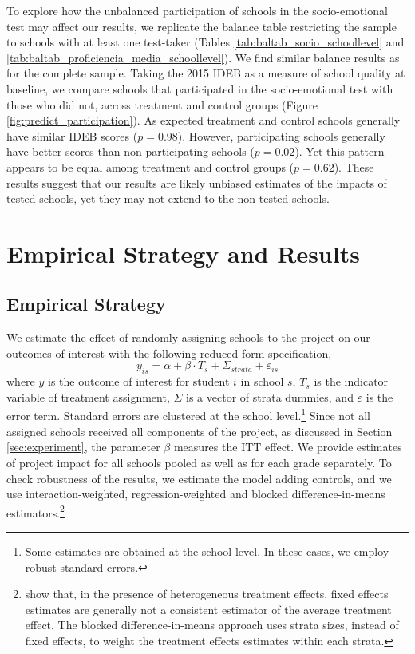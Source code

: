 \documentclass[11pt,a4paper]{article}
\begin{document}
To explore how the unbalanced participation of schools in the socio-emotional test may affect our results, we replicate the balance table restricting the sample to schools with at least one test-taker (Tables \ref{tab:baltab_socio_schoollevel} and \ref{tab:baltab_proficiencia_media_schoollevel}). We find similar balance results as for the complete sample. Taking the 2015 IDEB as a measure of school quality at baseline, we compare schools that participated in the socio-emotional test with those who did not, across treatment and control groups (Figure \ref{fig:predict_participation}). As expected treatment and control schools generally have similar IDEB scores ($p=0.98$). However, participating schools generally have better scores than non-participating schools ($p=0.02$). Yet this pattern appears to be equal among treatment and control groups ($p=0.62$). These results suggest that our results are likely unbiased estimates of the impacts of tested schools, yet they may not extend to the non-tested schools. 



\section{Empirical Strategy and Results} \label{sec:methodology_results}
\subsection{Empirical Strategy} \label{sec:methodology}

We estimate the effect of randomly assigning schools to the project on our outcomes of interest with the following reduced-form specification,
\begin{equation} \label{eq:OLS}
    y_{is} = \alpha + \beta \cdot T_{s} + \Sigma_{strata} + \varepsilon_{is}
\end{equation}
where $y$ is the outcome of interest for student $i$ in school $s$, $T_s$ is the indicator variable of treatment assignment, $\Sigma$ is a vector of strata dummies, and $\varepsilon$ is the error term. Standard errors are clustered at the school level.\footnote{Some estimates are obtained at the school level. In these cases, we employ robust standard errors.} Since not all assigned schools received all components of the project, as discussed in Section \ref{sec:experiment}, the parameter $\beta$ measures the ITT effect. We provide estimates of project impact for all schools pooled as well as for each grade separately. To check robustness of the results, we estimate the model adding controls, and we use interaction-weighted, regression-weighted and blocked difference-in-means estimators.\footnote{\cite{gibbons2018broken} show that, in the presence of heterogeneous treatment effects, fixed effects estimates are generally not a consistent estimator of the average treatment effect. The blocked difference-in-means approach uses strata sizes, instead of fixed effects, to weight the treatment effects estimates within each strata.}
\end{document}
